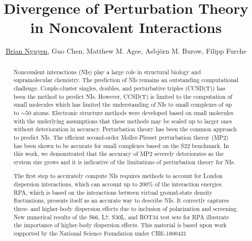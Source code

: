 \documentclass[journal=jctcce,manuscript=article]{achemso}
\title{Divergence of Perturbation Theory in Noncovalent Interactions}
\author{\underline{Brian Nguyen}, Guo Chen, Matthew M. Agee, Asbj{\"o}rn M. Burow,
Filipp Furche}
\begin{document}
\vspace*{-0.5in}
\begin{abstract}
  Noncovalent interactions (NIs) play a large role in structural biology
  and supramolecular chemistry. The prediction of NIs remains an outstanding
  computational challenge. Couple-cluster singles, doubles, and perturbative
  triples (CCSD(T)) has been the method to predict NIs. However, CCSD(T) is
  limited to the computation of small molecules which has limited the
  understanding of NIs to small complexes of up to $\sim 50$ atoms. Electronic
  structure methods were developed based on small molecules with the
  underlying assumptions that these methods may be scaled up to larger ones
  without deterioration in accuracy. Perturbation theory has been the common
  approach to predict NIs. The efficient second-order M{\o}ller-Plesset
  perturbation theroy (MP2) has been shown to be accurate for small complexes
  based on the S22 benchmark. In this work, we demonstrated that
  the accuracy of MP2 severely deteriorates as the system size grows and
  it is indicative of the limitations of perturbation theory for NIs.

  The first step to accurately compute NIs requires methods to account for
  London dispersion interactions, which can account up to 200$\%$ of the interaction
  energies. RPA, which is based on the interactions between virtual
  ground-state density fluctuations, presents itself as an accurate
  way to describe NIs. It correctly captures three- and higher-body
  dispersion effects due to inclusion of polarization and screening.
  New numerical results of the S66, L7, S30L, and ROT34 test sets for RPA
  illustrate the importance of higher-body dispersion effects.
  This material is based upon work supported by the National Science Foundation 
  under CHE-1800431  

\end{abstract}
\end{document}

